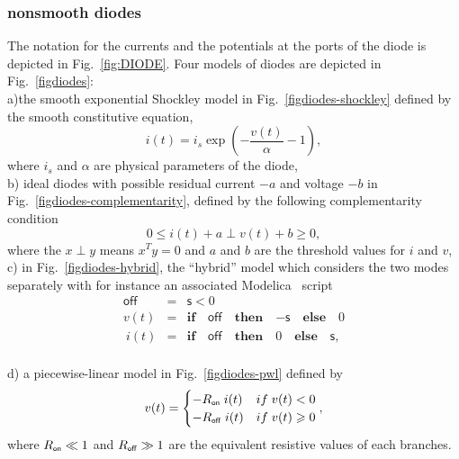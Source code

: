 \subsubsection{nonsmooth  diodes}  The notation for the currents and the potentials at the ports of the diode is depicted in Fig.~\ref{fig:DIODE}. Four models of diodes are depicted in Fig.~\ref{figdiodes}:\\
a)the smooth exponential Shockley model in Fig.~\ref{figdiodes-shockley} defined by the smooth constitutive equation,
  \begin{equation}
    \label{eq:diode-shockley}
     i(t) = i_s \exp(- \frac{v(t)}{\alpha} - 1),
  \end{equation}
where $i_s$ and $\alpha$ are physical parameters of the diode,\\
b) ideal diodes with possible residual current $-a$ and voltage $-b$ in Fig.~\ref{figdiodes-complementarity}, defined by the following complementarity condition
  \begin{equation}
    \label{eq:diode-complementarity}
     0\leq i(t)+a \perp v(t)+b \geq 0 ,
  \end{equation}
where the $x \perp y $ means $x^T y =0$ and $a$ and $b$ are the threshold values for $i$ and $v$,\\
c) in Fig.~\ref{figdiodes-hybrid}, the ``hybrid'' model which considers the two modes separately with for instance  an associated Modelica~\cite{elmqvist2001} script
  \begin{equation}
    \label{eq:diode-hybrid}
    \begin{array}{cll}
          \mathsf{off} &=& \mathsf{s} < 0 \\
          v(t)  &=& \mathbf{if}\quad \mathsf{off} \quad \mathbf{then}\quad \mathsf{-s} \quad \mathbf{else} \quad 0 \\
          \ i(t) &=& \mathbf{if}\quad \mathsf{off} \quad
          \mathbf{then}\quad 0  \quad \mathbf{else}\quad \mathsf{s},
        \end{array} 
  \end{equation}\\
d) a piecewise-linear model in Fig.~\ref{figdiodes-pwl} defined by
  \begin{equation}
    \label{eq:diode-pwl}
    v(t)=\begin{cases}-R_\on\; i(t) & \mbox{if}\;v(t) < 0 \\   -R_\off\; i(t) & \mbox{if}\;v(t) \geq  0 \\ \end{cases},
  \end{equation}
where $R_\on \ll 1 $ and $ R_\off \gg 1 $ are the  equivalent resistive values of each branches.

